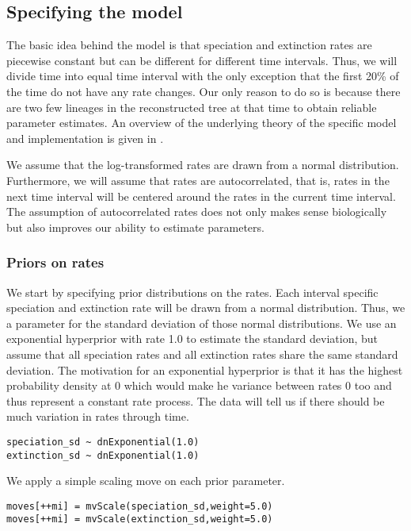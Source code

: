 \subsection{Specifying the model}

The basic idea behind the model is that speciation and extinction rates are piecewise constant but can be different for different time intervals.
Thus, we will divide time into equal time interval with the only exception that the first 20\% of the time do not have any rate changes.
Our only reason to do so is because there are two few lineages in the reconstructed tree at that time to obtain reliable parameter estimates.
An overview of the underlying theory of the specific model and implementation is given in \citep{Hoehna2015a}.

We assume that the log-transformed rates are drawn from a normal distribution.
Furthermore, we will assume that rates are autocorrelated, that is, rates in the next time interval will be centered around the rates in the current time interval.
The assumption of autocorrelated rates does not only makes sense biologically but also improves our ability to estimate parameters.


\subsubsection{Priors on rates}
We start by specifying prior distributions on the rates.
Each interval specific speciation and extinction rate will be drawn from a normal distribution.
Thus, we a parameter for the standard deviation of those normal distributions.
We use an exponential hyperprior with rate 1.0 to estimate the standard deviation, but assume that all speciation rates and all extinction rates share the same standard deviation.
The motivation for an exponential hyperprior is that it has the highest probability density at 0 which would make he variance between rates 0 too and thus represent a constant rate process.
The data will tell us if there should be much variation in rates through time.
{\tt \begin{snugshade*}
\begin{lstlisting}
speciation_sd ~ dnExponential(1.0)
extinction_sd ~ dnExponential(1.0)
\end{lstlisting}
\end{snugshade*}}
We apply a simple scaling move on each prior parameter.
{\tt \begin{snugshade*}
\begin{lstlisting}
moves[++mi] = mvScale(speciation_sd,weight=5.0)
moves[++mi] = mvScale(extinction_sd,weight=5.0)
\end{lstlisting}
\end{snugshade*}}

